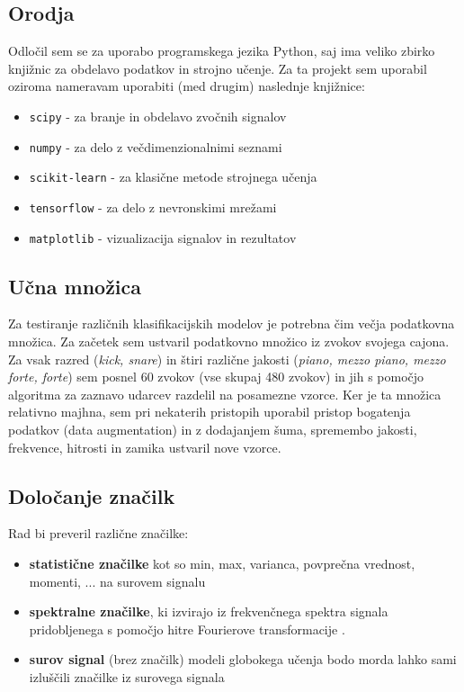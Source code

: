 \documentclass[11pt,a4paper]{article}
\begin{document}
\subsection{Orodja}
Odločil sem se za uporabo programskega jezika Python, saj ima veliko zbirko knjižnic za obdelavo podatkov in strojno učenje. Za ta projekt sem uporabil oziroma nameravam uporabiti (med drugim) naslednje knjižnice: 
\begin{itemize}
    \item \texttt{scipy} - za branje in obdelavo zvočnih signalov
    \item \texttt{numpy} - za delo z večdimenzionalnimi seznami
    \item \texttt{scikit-learn} - za klasične metode strojnega učenja
    \item \texttt{tensorflow} - za delo z nevronskimi mrežami
    \item \texttt{matplotlib} - vizualizacija signalov in rezultatov
\end{itemize}

\subsection{Učna množica}
Za testiranje različnih klasifikacijskih modelov je potrebna čim večja podatkovna množica. Za začetek sem ustvaril podatkovno množico iz zvokov svojega cajona. Za vsak razred (\emph{kick, snare}) in štiri različne jakosti (\emph{piano, mezzo piano, mezzo forte, forte}) sem posnel 60 zvokov (vse skupaj 480 zvokov) in jih s pomočjo algoritma za zaznavo udarcev razdelil na posamezne vzorce. Ker je ta množica relativno majhna, sem pri nekaterih pristopih uporabil pristop bogatenja podatkov (data augmentation) in z dodajanjem šuma, spremembo jakosti, frekvence, hitrosti in zamika ustvaril nove vzorce.

\subsection{Določanje značilk}
Rad bi preveril različne značilke:
\begin{itemize}
    \item \textbf{statistične značilke} kot so min, max, varianca, povprečna vrednost, momenti, ... na surovem signalu
    \item \textbf{spektralne značilke}, ki izvirajo iz frekvenčnega spektra signala pridobljenega s pomočjo hitre Fourierove transformacije \cite{TimbreID2009}.
    \item \textbf{surov signal} (brez značilk) modeli globokega učenja bodo morda lahko sami izluščili značilke iz surovega signala
\end{itemize}
\end{document}
